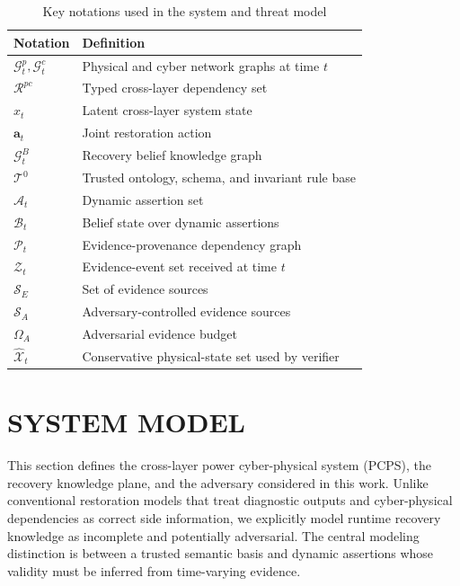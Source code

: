 \begin{table}[t]
\centering
\caption{Key notations used in the system and threat model}
\label{table-notations1}
\setlength{\tabcolsep}{1.5mm}
\begin{tabular}{ll}
\toprule[1.5pt]
Notation & Definition \\
\midrule
$\mathcal{G}^{p}_t,\mathcal{G}^{c}_t$ & Physical and cyber network graphs at time $t$ \\
$\mathcal{R}^{pc}$ & Typed cross-layer dependency set \\
$x_t$ & Latent cross-layer system state \\
$\mathbf{a}_t$ & Joint restoration action \\
$\mathcal{G}^{B}_t$ & Recovery belief knowledge graph \\
$\mathcal{T}^{0}$ & Trusted ontology, schema, and invariant rule base \\
$\mathcal{A}_t$ & Dynamic assertion set \\
$\mathcal{B}_t$ & Belief state over dynamic assertions \\
$\mathcal{P}_t$ & Evidence-provenance dependency graph \\
$\mathcal{Z}_t$ & Evidence-event set received at time $t$ \\
$\mathcal{S}_{E}$ & Set of evidence sources \\
$\mathcal{S}_{A}$ & Adversary-controlled evidence sources \\
$\Omega_A$ & Adversarial evidence budget \\
$\widehat{\mathcal X}_t$ & Conservative physical-state set used by verifier \\
\bottomrule[1.5pt]
\end{tabular}
\end{table}

\section{SYSTEM MODEL}
\label{sec-system-model}
This section defines the cross-layer power cyber-physical system (PCPS), the recovery knowledge plane, and the adversary considered in this work. Unlike conventional restoration models that treat diagnostic outputs and cyber-physical dependencies as correct side information, we explicitly model runtime recovery knowledge as incomplete and potentially adversarial. The central modeling distinction is between a trusted semantic basis and dynamic assertions whose validity must be inferred from time-varying evidence.

